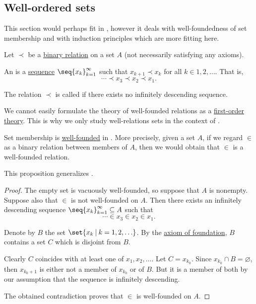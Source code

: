 \subsection{Well-ordered sets}\label{subsec:well_ordered_sets}

This section would perhaps fit in , however it deals with well-foundedness of set membership and with induction principles which are more fitting here.

\begin{definition}\label{def:well_founded_relation}
  Let \( \prec \) be a \hyperref[def:binary_relation]{binary relation} on a set \( A \) (not necessarily satisfying any axioms).

  An  is a \hyperref[def:sequence]{sequence} \( \seq{ x_k }_{k=1}^\infty \) such that \( x_{k+1} \prec x_k \) for all \( k \in 1, 2, \ldots \). That is,
  \begin{equation*}
    \cdots \prec x_3 \prec x_2 \prec x_1.
  \end{equation*}

  The relation \( \prec \) is called  if there exists no infinitely descending sequence.

  We cannot easily formulate the theory of well-founded relations as a \hyperref[def:first_order_theory]{first-order theory}. This is why we only study well-relations sets in the context of .
\end{definition}

\begin{proposition}\label{thm:set_membership_is_well_founded}
  Set membership is \hyperref[def:well_founded_relation]{well-founded} in . More precisely, given a set \( A \), if we regard \( \in \) as a binary relation between members of \( A \), then we would obtain that \( \in \) is a well-founded relation.

  This proposition generalizes .
\end{proposition}
\begin{proof}
  The empty set is vacuously well-founded, so suppose that \( A \) is nonempty. Suppose also that \( \in \) is not well-founded on \( A \). Then there exists an infinitely descending sequence \( \seq{ x_k }_{k=1}^\infty \subseteq A \) such that
  \begin{equation*}
    \cdots \in x_3 \in x_2 \in x_1.
  \end{equation*}

  Denote by \( B \) the set \( \set{ x_k \given k = 1, 2, \ldots } \). By the \hyperref[def:zfc/foundation]{axiom of foundation}, \( B \) contains a set \( C \) which is disjoint from \( B \).

  Clearly \( C \) coincides with at least one of \( x_1, x_2, \ldots \). Let \( C = x_{k_0} \). Since \( x_{k_0} \cap B = \varnothing \), then \( x_{k_0 + 1} \) is either not a member of \( x_{k_0} \) or of \( B \). But it is a member of both by our assumption that the sequence is infinitely descending.

  The obtained contradiction proves that \( \in \) is well-founded on \( A \).
\end{proof}

